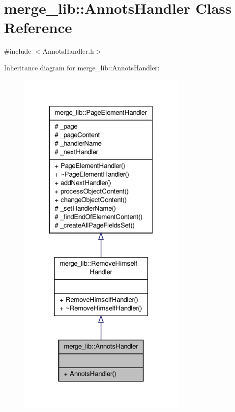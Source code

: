 \hypertarget{classmerge__lib_1_1_annots_handler}{\section{merge\-\_\-lib\-:\-:Annots\-Handler Class Reference}
\label{d9/dd5/classmerge__lib_1_1_annots_handler}
}


{\ttfamily \#include $<$Annots\-Handler.\-h$>$}



Inheritance diagram for merge\-\_\-lib\-:\-:Annots\-Handler\-:
\nopagebreak
\begin{figure}[H]
\begin{center}
\leavevmode
\includegraphics[width=236pt]{d1/dae/classmerge__lib_1_1_annots_handler__inherit__graph}
\end{center}
\end{figure}


